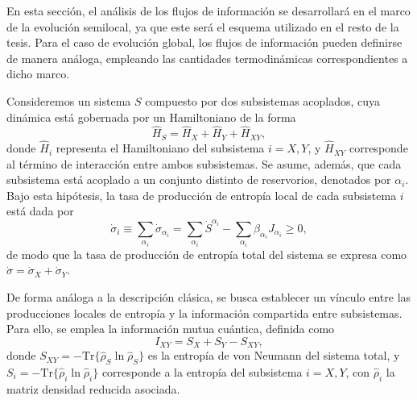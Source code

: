 En esta sección, el análisis de los flujos de información se desarrollará en el marco de la evolución semilocal, ya que este será el esquema utilizado en el resto de la tesis. Para el caso de evolución global, los flujos de información pueden definirse de manera análoga, empleando las cantidades termodinámicas correspondientes a dicho marco.

Consideremos un sistema $S$ compuesto por dos subsistemas acoplados, cuya dinámica está gobernada por un Hamiltoniano de la forma
\[
    \hat{H}_{S} = \hat{H}_{X} + \hat{H}_{Y} + \hat{H}_{XY}, 
\]
donde $\hat{H}_{i}$ representa el Hamiltoniano del subsistema $i = X,Y$, y $\hat{H}_{XY}$ corresponde al término de interacción entre ambos subsistemas. Se asume, además, que cada subsistema está acoplado a un conjunto distinto de reservorios, denotados por $\alpha_{i}$. Bajo esta hipótesis, la tasa de producción de entropía local de cada subsistema $i$ está dada por
\[
    \dot{\sigma}_{i} \equiv \sum_{\alpha_{i}} \dot{\sigma}_{\alpha_{i}} = \sum_{\alpha_{i}} \dot{S}^{\alpha_{i}} - \sum_{\alpha_{i}} \beta_{\alpha_{i}} J_{\alpha_{i}} \geq 0,
\]
de modo que la tasa de producción de entropía total del sistema se expresa como $\dot{\sigma} = \dot{\sigma}_{X} + \dot{\sigma}_{Y}$.

De forma análoga a la descripción clásica, se busca establecer un vínculo entre las producciones locales de entropía y la información compartida entre subsistemas. Para ello, se emplea la información mutua cuántica, definida como
\[
    I_{XY} = S_{X} + S_{Y} - S_{XY},
\]
donde $S_{XY} = -\mathrm{Tr}\{ \hat{\rho}_{S} \ln \hat{\rho}_{S} \}$ es la entropía de von Neumann del sistema total, y $S_{i} = - \mathrm{Tr}\{ \hat{\rho}_{i} \ln \hat{\rho}_{i} \}$ corresponde a la entropía del subsistema $i = X, Y$, con $\hat{\rho}_{i}$ la matriz densidad reducida asociada.

